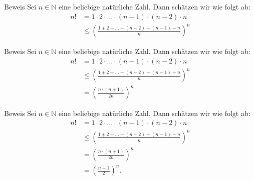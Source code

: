 \documentclass[10pt]{beamer}
\def\bN{\mathbb{N}}
\begin{document}
\begin{frame}{Beweis}
    Sei \( n \in \bN \) eine beliebige natürliche Zahl. Dann schätzen wir wie folgt ab:
    \begin{align*}
        n!
        & = 1 \cdot 2 \cdot \ldots \cdot \left( n - 1 \right) \cdot \left( n - 2 \right) \cdot n \\
        & \leq \left( \frac{1 + 2 + \ldots + \left( n - 2 \right) + \left( n - 1 \right) + n}{n} \right)^{n}
    \end{align*}
\end{frame}



\begin{frame}{Beweis}
    Sei \( n \in \bN \) eine beliebige natürliche Zahl. Dann schätzen wir wie folgt ab:
    \begin{align*}
        n!
        & = 1 \cdot 2 \cdot \ldots \cdot \left( n - 1 \right) \cdot \left( n - 2 \right) \cdot n \\
        & \leq \left( \frac{1 + 2 + \ldots + \left( n - 2 \right) + \left( n - 1 \right) + n}{n} \right)^{n} \\
        & = \left( \frac{n \cdot \left( n + 1 \right)}{2n} \right)^{n}
    \end{align*}
\end{frame}



\begin{frame}{Beweis}
    Sei \( n \in \bN \) eine beliebige natürliche Zahl. Dann schätzen wir wie folgt ab:
    \begin{align*}
        n!
        & = 1 \cdot 2 \cdot \ldots \cdot \left( n - 1 \right) \cdot \left( n - 2 \right) \cdot n \\
        & \leq \left( \frac{1 + 2 + \ldots + \left( n - 2 \right) + \left( n - 1 \right) + n}{n} \right)^{n} \\
        & = \left( \frac{n \cdot \left( n + 1 \right)}{2n} \right)^{n} \\
        & = \left( \frac{n + 1}{2} \right)^{n}.
    \end{align*}
\end{frame}
\end{document}
